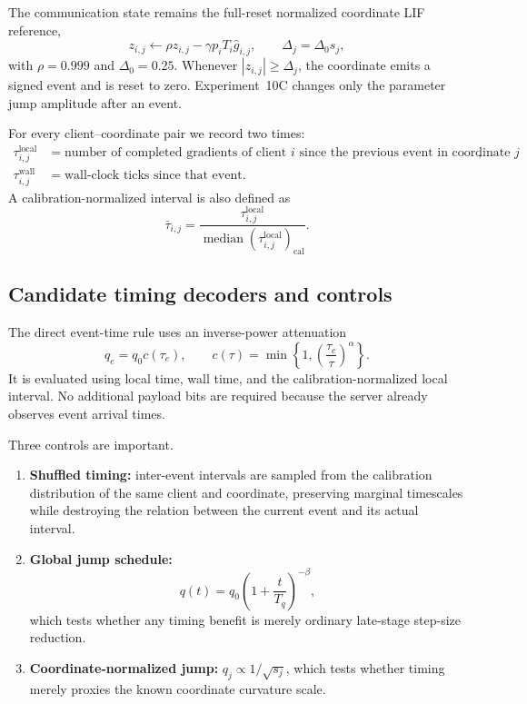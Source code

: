 The communication state remains the full-reset normalized coordinate LIF reference,
\begin{equation}
  z_{i,j}\leftarrow\rho z_{i,j}-\gamma p_iT_i\hat g_{i,j},
  \qquad
  \Delta_j=\Delta_0s_j,
\end{equation}
with $\rho=0.999$ and $\Delta_0=0.25$. Whenever $|z_{i,j}|\geq\Delta_j$, the coordinate emits a signed event and is reset to zero. Experiment~10C changes only the parameter jump amplitude after an event.

For every client--coordinate pair we record two times:
\begin{align}
  \tau^{\mathrm{local}}_{i,j} &= \text{number of completed gradients of client $i$ since the previous event in coordinate $j$},\\
  \tau^{\mathrm{wall}}_{i,j} &= \text{wall-clock ticks since that event}.
\end{align}
A calibration-normalized interval is also defined as
\begin{equation}
  \bar\tau_{i,j}=\frac{\tau^{\mathrm{local}}_{i,j}}{\operatorname{median}(\tau^{\mathrm{local}}_{i,j})_{\mathrm{cal}}}.
\end{equation}

\subsection{Candidate timing decoders and controls}

The direct event-time rule uses an inverse-power attenuation
\begin{equation}
  q_e=q_0c(\tau_e),
  \qquad
  c(\tau)=\min\left\{1,\left(\frac{\tau_c}{\tau}\right)^\alpha\right\}.
\end{equation}
It is evaluated using local time, wall time, and the calibration-normalized local interval. No additional payload bits are required because the server already observes event arrival times.

Three controls are important.
\begin{enumerate}
  \item \textbf{Shuffled timing:} inter-event intervals are sampled from the calibration distribution of the same client and coordinate, preserving marginal timescales while destroying the relation between the current event and its actual interval.
  \item \textbf{Global jump schedule:}
  \begin{equation}
    q(t)=q_0\left(1+\frac{t}{T_q}\right)^{-\beta},
  \end{equation}
  which tests whether any timing benefit is merely ordinary late-stage step-size reduction.
  \item \textbf{Coordinate-normalized jump:} $q_j\propto1/\sqrt{s_j}$, which tests whether timing merely proxies the known coordinate curvature scale.
\end{enumerate}

